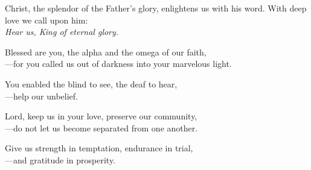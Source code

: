 \intercessions

\begin{raggedright}
Christ, the splendor of the Father’s glory, enlightens us with his word. With deep love we call upon him:\\
\emph{Hear us, King of eternal glory.}

\medskip
Blessed are you, the alpha and the omega of our faith,\\
{\color{red}---}for you called us out of darkness into your marvelous light.

\medskip
You enabled the blind to see, the deaf to hear,\\
{\color{red}---}help our unbelief.

\medskip
Lord, keep us in your love, preserve our community,\\
{\color{red}---}do not let us become separated from one another.

\medskip
Give us strength in temptation, endurance in trial,\\
{\color{red}---}and gratitude in prosperity.
\end{raggedright}